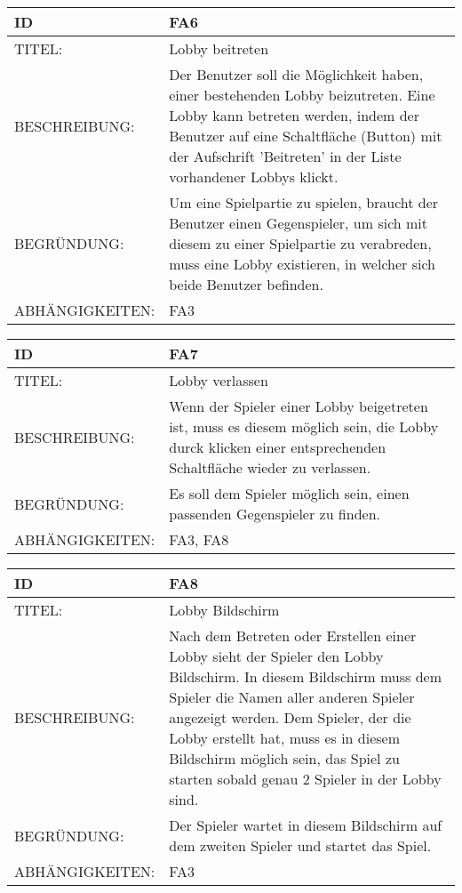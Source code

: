 \documentclass{uulm-assignment}
\begin{document}
\begin{tabularx}{16cm}{l|X}
\textbf{ID} & \textbf{FA6} \\
\hline
TITEL: & Lobby beitreten \\
\hline
BESCHREIBUNG: & Der Benutzer soll die Möglichkeit haben, einer bestehenden Lobby beizutreten.
Eine Lobby kann betreten werden, indem der Benutzer auf eine Schaltfläche (Button) mit der Aufschrift 'Beitreten' in der Liste vorhandener Lobbys klickt.
\\
\hline
BEGRÜNDUNG: & Um eine Spielpartie zu spielen, braucht der Benutzer einen Gegenspieler, um sich mit diesem zu einer Spielpartie zu verabreden, muss eine Lobby existieren, in welcher sich beide Benutzer befinden. \\
\hline
ABHÄNGIGKEITEN: & FA3 \\
\end{tabularx}

\begin{tabularx}{16cm}{l|X}
\textbf{ID} & \textbf{FA7} \\
\hline
TITEL: & Lobby verlassen \\
\hline
BESCHREIBUNG: & Wenn der Spieler einer Lobby beigetreten ist, muss es diesem möglich sein, die Lobby durck klicken einer entsprechenden Schaltfläche wieder zu verlassen.
\\
\hline
BEGRÜNDUNG: & Es soll dem Spieler möglich sein, einen passenden Gegenspieler zu finden.\\
\hline
ABHÄNGIGKEITEN: & FA3, FA8\\
\end{tabularx}

\begin{tabularx}{16cm}{l|X}
\textbf{ID} & \textbf{FA8} \\
\hline
TITEL: & Lobby Bildschirm\\
\hline
BESCHREIBUNG: & Nach dem Betreten oder Erstellen einer Lobby sieht der Spieler den Lobby Bildschirm.
In diesem Bildschirm muss dem Spieler die Namen aller anderen Spieler angezeigt werden.
Dem Spieler, der die Lobby erstellt hat, muss es in diesem Bildschirm möglich sein, das Spiel zu starten sobald genau 2 Spieler in der Lobby sind.
\\
\hline
BEGRÜNDUNG: & Der Spieler wartet in diesem Bildschirm auf dem zweiten Spieler und startet das Spiel.\\
\hline
ABHÄNGIGKEITEN: & FA3\\
\end{tabularx}
\end{document}
